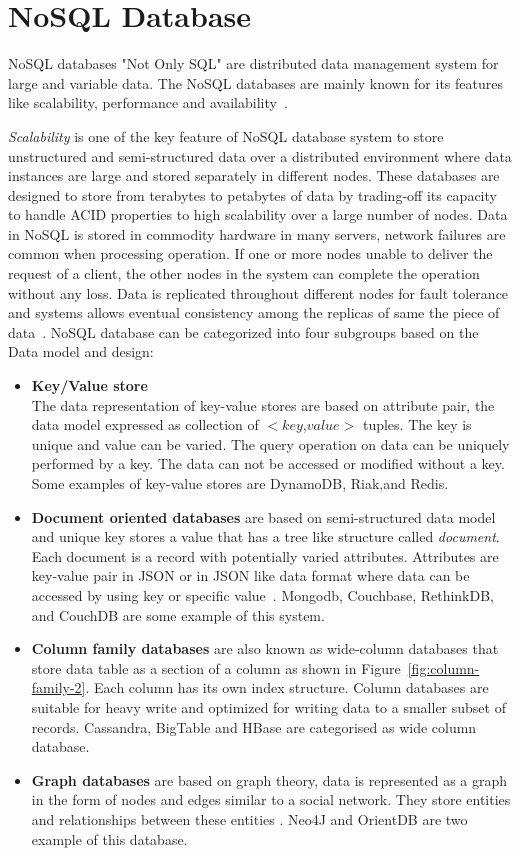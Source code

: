 	\section{NoSQL Database}
	NoSQL databases "Not Only SQL" are distributed data management system for large and variable data. The NoSQL databases are mainly known for its features like scalability, performance and availability~\citep{hecht2011nosql}.
	
	\textit{Scalability} is one of the key feature of NoSQL database system to store unstructured and semi-structured data over a distributed environment where data instances are large and stored separately in different nodes. These databases are designed to store from terabytes to petabytes of data by trading-off its capacity to handle ACID properties to high scalability over a large number of nodes\cite{abramova2013nosql}. 	
    Data in NoSQL is stored in commodity hardware in many servers, network failures are common when processing operation.  If one or more nodes unable to deliver the request of a client, the other nodes in the system can complete the operation without any loss. Data is replicated throughout different nodes for fault tolerance and systems allows eventual consistency among the replicas of same the piece of data~\cite{nosql/comparision}.  
    NoSQL database can be categorized into four subgroups based on the Data model and design:
	\begin{itemize}
		\item 
			\textbf{Key/Value store}\\ The data representation of key-value stores are based on attribute pair, the data model expressed as collection of $<$$key$,$value$$>$ tuples. The key is unique and value can be varied. The query operation on data can be uniquely performed by a key. The data can not be accessed or modified without a key. Some examples of key-value stores are DynamoDB, Riak,and Redis.
		\item 
			\textbf{Document oriented databases} are based on semi-structured data model and unique key stores a value that has a tree like structure called \textit{document}. Each document is a record with potentially varied attributes. Attributes are key-value pair in JSON or in JSON like data format where data can be accessed by using key or specific value~\citep{hecht2011nosql}. Mongodb, Couchbase, RethinkDB, and CouchDB are some example of this system.
		\item 
			\textbf{Column family databases} are also known as wide-column databases that store data table as a section of a column as shown in Figure~\ref{fig:column-family-2}. Each column has its own index structure.
			 Column databases are suitable for heavy write and optimized for writing data to a smaller subset of records. Cassandra, BigTable and HBase are categorised as wide column database.
		\item 
			\textbf{Graph databases} are based on graph theory, data  is represented as a graph in the form of nodes and edges similar to a social network. They store entities and relationships between these entities . Neo4J and OrientDB are two example of this database.
	\end{itemize}
